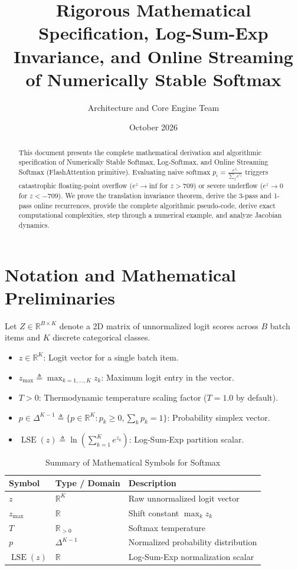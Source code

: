 \documentclass[11pt,a4paper]{article}
\title{\textbf{Rigorous Mathematical Specification, Log-Sum-Exp Invariance, and Online Streaming of Numerically Stable Softmax}}
\author{Architecture and Core Engine Team}
\date{October 2026}
\theoremstyle{definition}
\begin{document}
\maketitle

\begin{abstract}
This document presents the complete mathematical derivation and algorithmic specification of Numerically Stable Softmax, Log-Softmax, and Online Streaming Softmax (FlashAttention primitive). Evaluating naive softmax $p_i = \frac{e^{z_i}}{\sum_j e^{z_j}}$ triggers catastrophic floating-point overflow ($e^{z} \to \text{inf}$ for $z > 709$) or severe underflow ($e^z \to 0$ for $z < -709$). We prove the translation invariance theorem, derive the 3-pass and 1-pass online recurrences, provide the complete algorithmic pseudo-code, derive exact computational complexities, step through a numerical example, and analyze Jacobian dynamics.
\end{abstract}

\section{Notation and Mathematical Preliminaries}

Let $Z \in \mathbb{R}^{B \times K}$ denote a 2D matrix of unnormalized logit scores across $B$ batch items and $K$ discrete categorical classes.

\begin{itemize}
    \item $z \in \mathbb{R}^K$: Logit vector for a single batch item.
    \item $z_{\max} \triangleq \max_{k=1, \dots, K} z_k$: Maximum logit entry in the vector.
    \item $T > 0$: Thermodynamic temperature scaling factor ($T = 1.0$ by default).
    \item $p \in \Delta^{K-1} \triangleq \{p \in \mathbb{R}^K : p_k \ge 0, \sum_k p_k = 1\}$: Probability simplex vector.
    \item $\operatorname{LSE}(z) \triangleq \ln \left( \sum_{k=1}^K e^{z_k} \right)$: Log-Sum-Exp partition scalar.
\end{itemize}

\begin{table}[h]
\centering
\caption{Summary of Mathematical Symbols for Softmax}
\begin{tabular}{lll}
\toprule
\textbf{Symbol} & \textbf{Type / Domain} & \textbf{Description} \\
\midrule
$z$ & $\mathbb{R}^K$ & Raw unnormalized logit vector \\
$z_{\max}$ & $\mathbb{R}$ & Shift constant $\max_k z_k$ \\
$T$ & $\mathbb{R}_{> 0}$ & Softmax temperature \\
$p$ & $\Delta^{K-1}$ & Normalized probability distribution \\
$\operatorname{LSE}(z)$ & $\mathbb{R}$ & Log-Sum-Exp normalization scalar \\
\bottomrule
\end{tabular}
\end{table}
\end{document}
